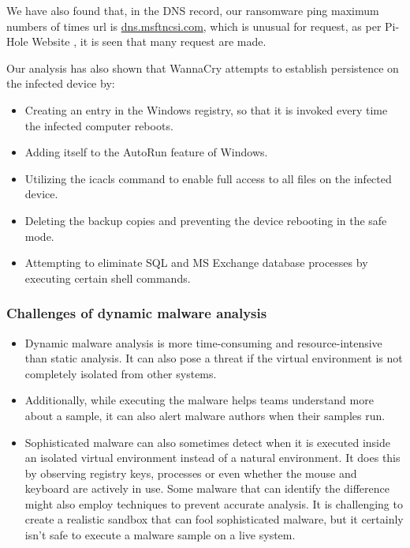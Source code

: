 \documentclass[12pt,letterpaper]{article}
\begin{document}
    We have also found that, in the DNS record, our ransomware ping maximum numbers of times url is \url{dns.msftncsi.com}, which is unusual for request, as per Pi-Hole Website \cite{pi-hole}, it is seen that many request are made.

    Our analysis has also shown that WannaCry attempts to establish persistence on the infected device by: 

    \begin{itemize}
 
        \item Creating an entry in the Windows registry, so that it is invoked every time the infected computer reboots.
        
        \item Adding itself to the AutoRun feature of Windows. 

        \item  Utilizing the icacls command to enable full access to all files on the infected device.

        \item  Deleting the backup copies and preventing the device rebooting in the safe mode.

        \item Attempting to eliminate SQL and MS Exchange database processes by executing certain shell commands.
        
    \end{itemize}

    \subsubsection{Challenges of dynamic malware analysis}

    \begin{itemize}
        
        \item Dynamic malware analysis is more time-consuming and resource-intensive than static analysis. It can also pose a threat if the virtual environment is not completely isolated from other systems.

        \item Additionally, while executing the malware helps teams understand more about a sample, it can also alert malware authors when their samples run.

        \item Sophisticated malware can also sometimes detect when it is executed inside an isolated virtual environment instead of a natural environment. It does this by observing registry keys, processes or even whether the mouse and keyboard are actively in use. Some malware that can identify the difference might also employ techniques to prevent accurate analysis. It is challenging to create a realistic sandbox that can fool sophisticated malware, but it certainly isn't safe to execute a malware sample on a live system.
    \end{itemize}
    
\end{document}

